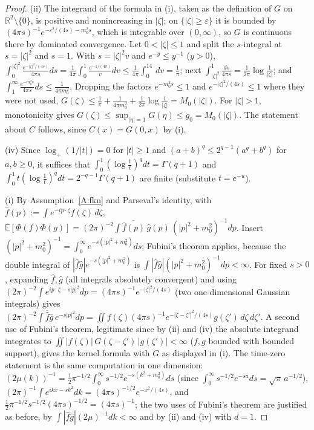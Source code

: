 \documentclass[11pt,a4paper]{article}
\theoremstyle{plain}
\theoremstyle{definition}
\theoremstyle{plain}
\theoremstyle{definition}
\newcommand{\R}{\mathbb{R}}
\newcommand{\E}{\mathbb{E}}
\begin{document}
\begin{proof}
(ii) The integrand of the formula in (i), taken as the definition of $G$ on
$\R^2\setminus\{0\}$, is positive and nonincreasing in $|\zeta|$; on $\{|\zeta|\ge\varepsilon\}$
it is bounded by $(4\pi s)^{-1}e^{-\varepsilon^2/(4s)-m_0^2s}$, which is integrable over
$(0,\infty)$, so $G$ is continuous there by dominated convergence. Let $0<|\zeta|\le1$ and split
the $s$-integral at $s=|\zeta|^2$ and $s=1$. With $s=|\zeta|^2v$ and $e^{-y}\le y^{-1}$
($y>0$),
$\int_0^{|\zeta|^2}\frac{e^{-|\zeta|^2/(4s)}}{4\pi s}ds=\frac1{4\pi}\int_0^1\frac{e^{-1/(4v)}}{v}dv
\le\frac1{4\pi}\int_0^14\,dv=\frac1\pi$; next
$\int_{|\zeta|^2}^1\frac{ds}{4\pi s}=\frac1{2\pi}\log\frac1{|\zeta|}$; and
$\int_1^\infty\frac{e^{-m_0^2s}}{4\pi s}ds\le\frac1{4\pi m_0^2}$. Dropping the factors
$e^{-m_0^2s}\le1$ and $e^{-|\zeta|^2/(4s)}\le1$ where they were not used,
$G(\zeta)\le\frac1\pi+\frac1{4\pi m_0^2}+\frac1{2\pi}\log\frac1{|\zeta|}=M_0(|\zeta|)$. For
$|\zeta|>1$, monotonicity gives $G(\zeta)\le\sup_{|\eta|=1}G(\eta)\le g_0=M_0(|\zeta|)$. The
statement about $C$ follows, since $C(x)=G(0,x)$ by (i).

(iv) Since $\log_+(1/|t|)=0$ for $|t|\ge1$ and $(a+b)^q\le2^{q-1}(a^q+b^q)$ for $a,b\ge0$, it
suffices that $\int_0^1(\log\frac1t)^qdt=\Gamma(q+1)$ and
$\int_0^1t(\log\frac1t)^qdt=2^{-q-1}\Gamma(q+1)$ are finite (substitute $t=e^{-u}$).

(i) By Assumption~\ref{A:fkn} and Parseval's identity, with $\hat f(p):=\int e^{-ip\cdot\zeta}f(\zeta)\,d\zeta$,
$\E[\Phi(f)\Phi(g)]=(2\pi)^{-2}\int\overline{\hat f(p)}\,\hat g(p)\,(|p|^2+m_0^2)^{-1}dp$.
Insert $(|p|^2+m_0^2)^{-1}=\int_0^\infty e^{-s(|p|^2+m_0^2)}ds$; Fubini's theorem applies,
because the double integral of $|\hat f\hat g|e^{-s(|p|^2+m_0^2)}$ is
$\int|\hat f\hat g|(|p|^2+m_0^2)^{-1}dp<\infty$. For fixed $s>0$, expanding $\hat f,\hat g$
(all integrals absolutely convergent) and using
$(2\pi)^{-2}\int e^{ip\cdot\zeta-s|p|^2}dp=(4\pi s)^{-1}e^{-|\zeta|^2/(4s)}$ (two
one-dimensional Gaussian integrals) gives
$(2\pi)^{-2}\int\overline{\hat f}\hat g\,e^{-s|p|^2}dp
=\iint f(\zeta)(4\pi s)^{-1}e^{-|\zeta-\zeta'|^2/(4s)}g(\zeta')\,d\zeta\,d\zeta'$. A second use
of Fubini's theorem, legitimate since by (ii) and (iv) the absolute integrand integrates to
$\iint|f(\zeta)|\,G(\zeta-\zeta')\,|g(\zeta')|<\infty$ ($f,g$ bounded with bounded support),
gives the kernel formula with $G$ as displayed in (i). The time-zero statement is the same
computation in one dimension: $(2\mu(k))^{-1}=\frac12\pi^{-1/2}\int_0^\infty
s^{-1/2}e^{-s(k^2+m_0^2)}ds$ (since $\int_0^\infty s^{-1/2}e^{-sa}ds=\sqrt\pi\,a^{-1/2}$),
$(2\pi)^{-1}\int e^{ikx-sk^2}dk=(4\pi s)^{-1/2}e^{-x^2/(4s)}$, and
$\frac12\pi^{-1/2}s^{-1/2}(4\pi s)^{-1/2}=(4\pi s)^{-1}$; the two uses of Fubini's theorem are
justified as before, by $\int|\hat f\hat g|(2\mu)^{-1}dk<\infty$ and by (ii) and (iv) with
$d=1$.


\end{proof}
\end{document}
